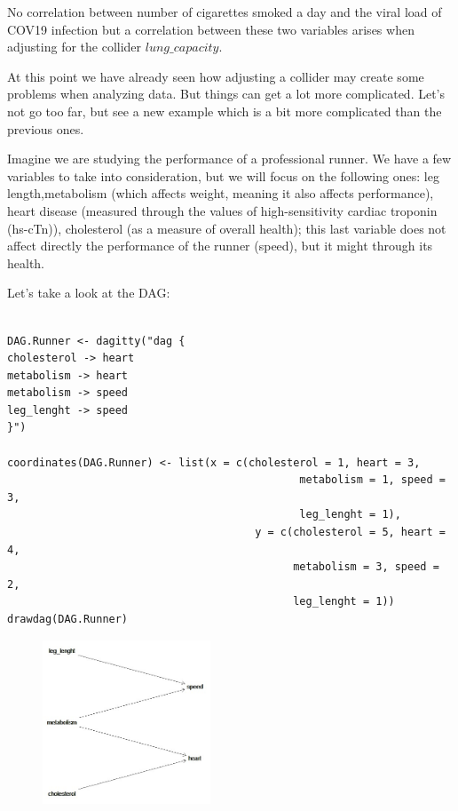 \documentclass{article}
\begin{document}
No correlation between number of cigarettes smoked a day and the viral load of COV19 infection but a correlation between these two variables arises when  adjusting for the collider \(lung\_capacity\).

At this point we have already seen how adjusting a collider may create some problems when analyzing data. But things can get a lot more complicated. Let's  not go too far, but see a new example which is a bit more complicated than the previous ones.

Imagine we are studying the performance of a professional runner. We have a few variables to take into consideration, but we will focus on the following ones: leg length,metabolism (which affects weight, meaning it also affects performance), heart disease (measured through the values of high-sensitivity cardiac troponin  (hs-cTn)), cholesterol (as a measure of overall health); this last variable  does not affect directly the performance of the runner (speed), but it might through its health. 

Let's take a look at the DAG:


\begin{lstlisting}

DAG.Runner <- dagitty("dag {
cholesterol -> heart
metabolism -> heart
metabolism -> speed
leg_lenght -> speed
}")

coordinates(DAG.Runner) <- list(x = c(cholesterol = 1, heart = 3, 
                                              metabolism = 1, speed = 3, 
                                              leg_lenght = 1),
                                       y = c(cholesterol = 5, heart = 4, 
                                             metabolism = 3, speed = 2, 
                                             leg_lenght = 1))
drawdag(DAG.Runner)

\end{lstlisting}


\begin{figure}[h]
\includegraphics[width=5cm]{DAG_Runner.png}
\centering
\end{figure}
\end{document}
